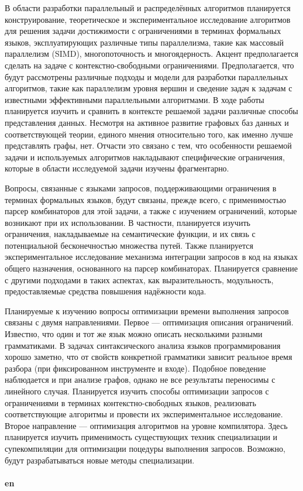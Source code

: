 \documentclass[12pt]{article}  %
\theoremstyle{remark}
\begin{document}
В области разработки параллельный и распределённых алгоритмов планируется конструирование, теоретическое и экспериментальное исследование алгоритмов для решения задачи достижимости с ограничениями в терминах формальных языков, эксплуатирующих различные типы параллелизма, такие как массовый параллелизм (SIMD), многопоточность и многоядерность. Акцент предполагается сделать на задаче с контекстно-свободными ограничениями. Предполагается, что будут рассмотрены различные подходы и модели для разработки параллельных алгоритмов, такие как параллелизм уровня вершин и сведение задач к задачам с известными эффективными параллельными алгоритмами. В ходе работы планируется изучить и сравнить в контексте решаемой задачи различные способы представления данных. Несмотря на активное развитие графовых баз данных и соответствующей теории, единого мнения относительно того, как именно лучше представлять графы, нет. Отчасти это связано с тем, что особенности решаемой задачи и используемых алгоритмов накладывают специфические ограничения, которые в области исследуемой задачи изучены фрагментарно.

Вопросы, связанные с языками запросов, поддерживающими ограничения в терминах формальных языков, будут связаны, прежде всего, с применимостью парсер комбинаторов для этой задачи, а также с изучением ограничений, которые возникают при их использовании.
В частности, планируется изучить ограничения, накладываемые на семантические функции, и их связь с потенциальной бесконечностью множества путей.
Также планируется экспериментальное исследование механизма интеграции запросов в код на языках общего назначения, основанного на парсер комбинаторах. Планируется сравнение с другими подходами в таких аспектах, как выразительность, модульность, предоставляемые средства повышения надёжности кода.

Планируемые к изучению вопросы оптимизации времени выполнения запросов связаны с двумя направлениями.
Первое --- оптимизация описания ограничений.
Известно, что один и тот же язык можно описать несколькими разными грамматиками.
В задачах синтаксического анализа языков программирования хорошо заметно, что от свойств конкретной грамматики зависит реальное время разбора (при фиксированном инструменте и входе).
Подобное поведение наблюдается и при анализе графов, однако не все результаты переносимы с линейного случая. Планируется изучить способы оптимизации запросов с ограничениями в терминах контекстно-свободных языков, реализовать соответствующие алгоритмы и провести их экспериментальное исследование. Второе направление --- оптимизация алгоритмов на уровне компилятора. Здесь планируется изучить применимость существующих техник специализации и супекомпиляции для оптимизации поцедуры выполнения запросов. Возможно, будут разрабатываться новые методы специализации.
\\
\\
\textbf{en}\\
\end{document}
